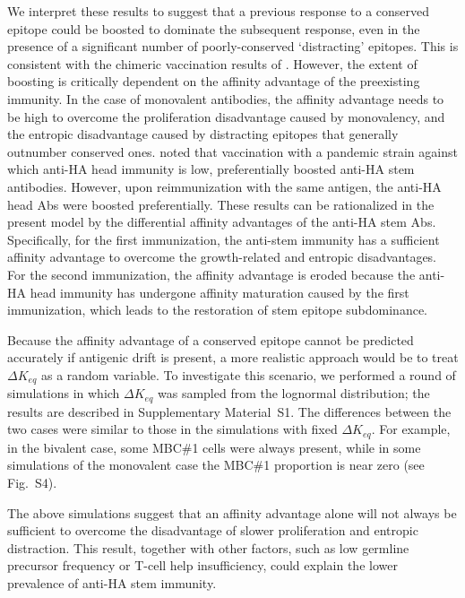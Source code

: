 \documentclass[utf8]{frontiersHLTH}%
\newcommand{\vo}[1]{#1} %
\newcommand{\SI}{Supplementary Material}
\begin{document}
We interpret these results to suggest that a previous response to a conserved
epitope could be boosted to dominate the subsequent response, even in the
presence of a significant number of poorly-conserved `distracting'
epitopes.  This is consistent with the chimeric vaccination results of
\citet{nachbagauer17a}. However, the extent of boosting is
critically dependent on the affinity advantage of the preexisting
immunity. In the case of monovalent antibodies, the affinity
advantage needs to be high to \vo{overcome} the proliferation
disadvantage caused by monovalency, and the entropic disadvantage
caused by distracting epitopes that generally outnumber conserved ones.
\citet{ellebedy14} noted that vaccination with a pandemic strain against
which anti-HA head immunity is low, preferentially boosted anti-HA stem
antibodies. However, upon reimmunization with the same antigen, the
anti-HA head Abs were boosted preferentially. These results can be
rationalized in the present model by the
differential affinity advantages of the anti-HA stem Abs.  Specifically, for the first
immunization, the anti-stem immunity has a sufficient affinity advantage
to overcome the growth-related and entropic disadvantages. For the second
immunization, the affinity advantage is eroded because the anti-HA head
immunity has undergone affinity maturation caused by the first
immunization, which leads to the restoration of stem epitope
subdominance.

Because the affinity advantage of a conserved epitope cannot be predicted
accurately if antigenic drift is present, a more realistic approach would
be to treat $\Delta K_{eq}$ as a random variable. To investigate this
scenario, we performed a round of simulations in which $\Delta K_{eq}$
was sampled from the lognormal distribution; the results are described in
\SI~S1. The differences between the
two cases were similar to those in the simulations with
fixed $\Delta K_{eq}$. For example, in the bivalent case, some MBC\#1
cells were always present, while in some simulations of the
monovalent case the MBC\#1 proportion is near zero (see Fig.~S4).

The above simulations suggest that an affinity advantage alone will not always be
sufficient to overcome the disadvantage of slower proliferation and
entropic distraction. This result, together with other factors, such as low
germline precursor frequency or T-cell help insufficiency,\cite{tan19}
could explain the lower prevalence of anti-HA stem immunity.
\end{document}
